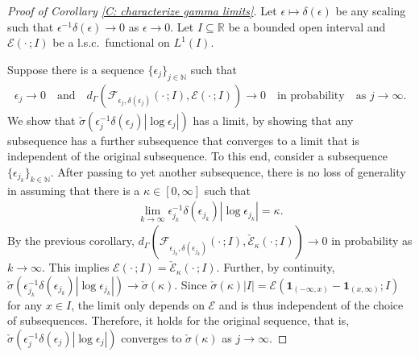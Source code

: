 \documentclass[10pt,a4paper]{amsart}
\begin{document}
\begin{proof}[Proof of Corollary \ref{C: characterize gamma limits}] Let $\epsilon \mapsto \delta(\epsilon)$ be any scaling such that $\epsilon^{-1}\delta(\epsilon) \to 0$ as $\epsilon \to 0$.  Let $I \subseteq \mathbb{R}$ be a bounded open interval and $\mathscr{E}(\cdot \, ; I )$ be a l.s.c.\ functional on $L^{1}(I)$.

Suppose there is a sequence $\{\epsilon_{j}\}_{j \in \mathbb{N}}$ such that 
    \begin{align*}
    \epsilon_{j} \to 0 \quad \text{and} \quad d_{\Gamma}( \mathscr{F}_{\epsilon_{j},\delta(\epsilon_{j})}( \cdot \, ; I ) , \mathscr{E} ( \cdot \, ; I ) ) \to 0 \quad \text{in probability} \quad \text{as} \, \, j \to \infty.
    \end{align*}
    We show that $ \check{\sigma} ( \epsilon_{j}^{-1} \delta(\epsilon_{j}) | \log \epsilon_{j} | ) $ has a limit, by showing that any subsequence has a further subsequence that converges to a limit that is independent of the original subsequence. To this end, consider a subsequence $\{\epsilon_{j_{k}}\}_{k \in \mathbb{N}}$.  After passing to yet another subsequence, there is no loss of generality in assuming that there is a $\kappa \in [0,\infty]$ such that 
    \begin{align*}
        \lim_{ k \to \infty } \epsilon_{j_{k}}^{-1} \delta(\epsilon_{j_{k}}) | \log \epsilon_{j_{k}} | = \kappa . 
    \end{align*}
By the previous corollary, $d_{\Gamma}( \mathscr{F}_{\epsilon_{j_{k}},\delta(\epsilon_{j_{k}})} ( \cdot \, ; I ) , \check{\mathscr{E}}_{\kappa}(\cdot \, ; I ) ) \to 0$ in probability as $k \to \infty$.  This implies $\mathscr{E}( \cdot \, ; I ) = \check{\mathscr{E}}_{\kappa}(\cdot \, ; I )$.  Further, by continuity, $\check{\sigma}(\epsilon_{j_{k}}^{-1} \delta(\epsilon_{j_{k}}) | \log \epsilon_{j_{k}} |) \to \check{\sigma}(\kappa)$. Since $ \check{\sigma}(\kappa) | I | = \mathscr{E} ( \boldsymbol{1}_{ ( - \infty, x ) } - \boldsymbol{1}_{ ( x, \infty ) }; I ) $ for any $x \in I$, the limit only depends on $ \mathscr{E} $ and is thus independent of the choice of subsequences. Therefore, it holds for the original sequence, that is, $\check{\sigma}(\epsilon_{j}^{-1} \delta(\epsilon_{j}) | \log \epsilon_{j} | )$ converges to $\check{\sigma}(\kappa)$ as $j \to \infty$.


\end{proof}
\end{document}
